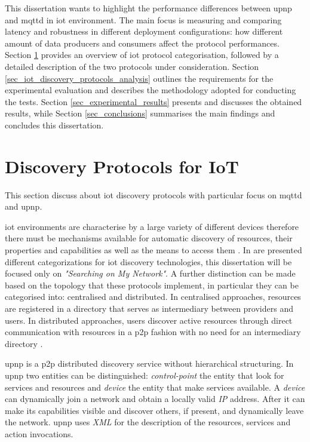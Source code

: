 \documentclass[lettersize,journal]{IEEEtran}
\begin{document}
This dissertation wants to highlight the performance differences between \gls{upnp} and \gls{mqttd} in \gls{iot} environment. The main focus is measuring and comparing latency and robustness in different deployment configurations: how different amount of data producers and consumers affect the protocol performances.
Section \ref{sec_discovery_protocols_for_iot} provides an overview of \gls{iot} protocol categorisation, followed by a detailed description of the two protocols under consideration. Section \ref{sec_iot_discovery_protocols_analysis} outlines the requirements for the experimental evaluation and describes the methodology adopted for conducting the tests. Section \ref{sec_experimental_results} presents and discusses the obtained results, while Section \ref{sec_conclusions} summarises the main findings and concludes this dissertation.

\section{Discovery Protocols for IoT}
\label{sec_discovery_protocols_for_iot}

This section discuss about \gls{iot} discovery protocols with particular focus on {\gls{mqttd}} and \gls{upnp}.

\gls{iot} environments are characterise by a large variety of different devices therefore there must be mechanisms available for automatic discovery of resources, their properties and capabilities as well as the means to access them \cite{Resource_discovery_in_IoT}.
In \cite{Categorization_Discovery_IoT} are presented different categorizations for \gls{iot} discovery technologies, this dissertation will be focused only on \textit{"Searching on My Network"}. A further distinction can be made based on the topology that these protocols implement, in particular they can be categorised into: centralised and distributed.
In centralised approaches, resources are registered in a directory that serves as intermediary between providers and users. In distributed approaches, users discover active resources through direct communication with resources in a \gls{p2p} fashion with no need for an intermediary directory \cite{comp_ana_disc}.

\gls{upnp} is a \gls{p2p} distributed discovery service without hierarchical structuring.
In \gls{upnp} two entities can be distinguished: \textit{control-point} the entity that look for services and resources and \textit{device} the entity that make services available.
A \textit{device} can dynamically join a network and obtain a locally valid \textit{IP} address. After it can make its capabilities visible and discover others, if present, and dynamically leave the network.
\gls{upnp} uses \textit{XML} for the description of the resources, services and action invocations. 
\end{document}
